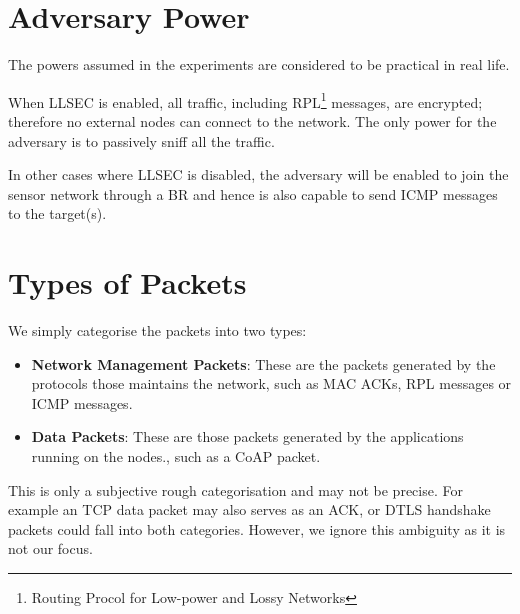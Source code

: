 \section{Adversary Power}
The powers assumed in the experiments are considered to be practical in real life.

When LLSEC is enabled, all traffic, including RPL\footnote{Routing Procol for Low-power and Lossy Networks} messages, are encrypted; therefore no external nodes can connect to the network. The only power for the adversary is to passively sniff all the traffic.

In other cases where LLSEC is disabled, the adversary will be  enabled to join the sensor network through a BR and hence is also capable to send ICMP messages to the target(s).

\section{Types of Packets}
We simply categorise the packets into two types:
\begin{itemize}
\item {\bf Network Management Packets}: These are the packets generated by the protocols those maintains the network, such as MAC ACKs, RPL messages or ICMP messages.
\item {\bf Data Packets}: These are those packets generated by the applications running on the nodes., such as a CoAP packet.
\end{itemize}

This is only a subjective rough categorisation and may not be precise. For example an TCP data packet may also serves as an ACK, or DTLS handshake packets could fall into both categories. However, we ignore this ambiguity as it is not our focus.